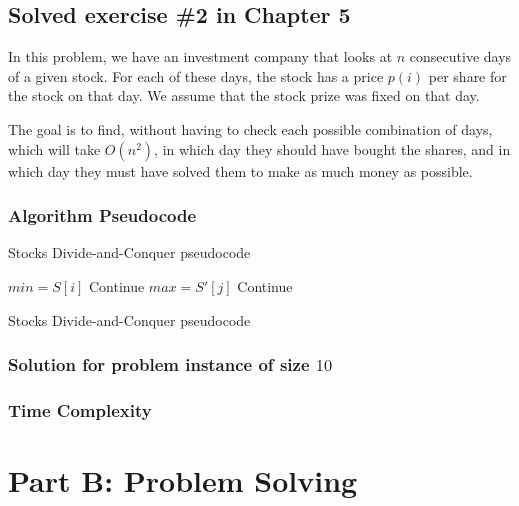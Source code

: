\documentclass{article}
\begin{document}
\subsection*{Solved exercise \#2 in Chapter 5}

In this problem, we have an investment company that looks at $n$ consecutive days of a given stock. For each of these days, the stock has a price $p(i)$ per share for the stock on that day. We assume that the stock prize was fixed on that day.

The goal is to find, without having to check each possible combination of days, which will take $O(n^2)$, in which day they should have bought the shares, and in which day they must have solved them to make as much money as possible.

\subsubsection*{Algorithm Pseudocode}

\begin{algorithm}[H]
\caption{Stocks Divide-and-Conquer pseudocode}
\begin{algorithmic}[1]
 \EndIf
 \Else{}
 \EndIf
\EndFunction


  \State $min = S[i]$
 \EndIf
 \Else{}
  \State Continue
 \EndIf
\EndFor
{}
  \State $max = S'[j]$
 \EndIf
 \Else{}
  \State Continue
 \EndIf
\EndFor
\end{algorithmic}
\end{algorithm}

\begin{algorithm}[H]
\caption{Stocks Divide-and-Conquer pseudocode}
\begin{algorithmic}[1]
\EndFunction
\end{algorithmic}
\end{algorithm}

\subsubsection*{Solution for problem instance of size $10$}

\subsubsection*{Time Complexity}

\section*{Part B: Problem Solving}
\end{document}
